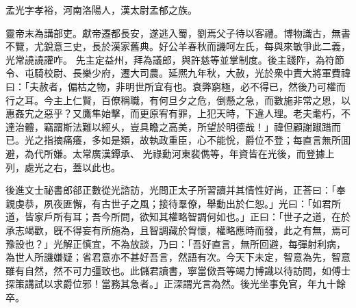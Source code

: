 \begin{pinyinscope}
 
 
 孟光字孝裕，河南洛陽人，漢太尉孟郁之族。
 
 
 靈帝末為講部吏。獻帝遷都長安，遂逃入蜀，劉焉父子待以客禮。博物識古，無書不覽，尤銳意三史，長於漢家舊典。好公羊春秋而譏呵左氏，每與來敏爭此二義，光常譊譊讙咋。
 先主定益州，拜為議郎，與許慈等並掌制度。後主踐阼，為符節令、屯騎校尉、長樂少府，遷大司農。延熈九年秋，大赦，光於衆中責大將軍費禕曰：「夫赦者，偏枯之物，非明世所宜有也。衰弊窮極，必不得已，然後乃可權而行之耳。今主上仁賢，百僚稱職，有何旦夕之危，倒懸之急，而數施非常之恩，以惠姦宄之惡乎？又鷹隼始擊，而更原宥有罪，上犯天時，下違人理。老夫耄朽，不達治體，竊謂斯法難以經乆，豈具瞻之高美，所望於明德哉！」禕但顧謝踧踖而已。光之指摘痛癢，多如是類，故執政重臣，心不能恱，爵位不登；每直言無所囬避，為代所嫌。太常廣漢鐔承、
 光祿勳河東裴儁等，年資皆在光後，而登據上列，處光之右，蓋以此也。
 
 
 
 
 後進文士祕書郎郤正數從光諮訪，光問正太子所習讀并其情性好尚，正荅曰：「奉親虔恭，夙夜匪懈，有古世子之風；接待羣僚，舉動出於仁恕。」光曰：「如君所道，皆家戶所有耳；吾今所問，欲知其權略智調何如也。」正曰：「世子之道，在於承志竭歡，旣不得妄有所施為，且智調藏於胷懷，權略應時而發，此之有無，焉可豫設也？」光解正慎宜，不為放談，乃曰：「吾好直言，無所回避，每彈射利病，為世人所譏嫌疑；省君意亦不甚好吾言，然語有次。今天下未定，智意為先，智意雖有自然，然不可力彊致也。此儲君讀書，寧當傚吾等竭力博識以待訪問，如傅士探策講試以求爵位邪！當務其急者。」正深謂光言為然。後光坐事免官，年九十餘卒。
 
 
\end{pinyinscope}